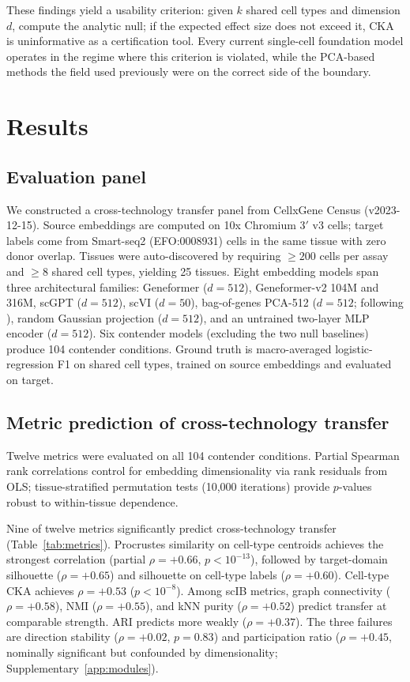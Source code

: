 \documentclass[11pt]{article}
\begin{document}
These findings yield a usability criterion: given $k$ shared cell types
and dimension $d$, compute the analytic null; if the expected effect
size does not exceed it, CKA is uninformative as a certification tool.
Every current single-cell foundation model operates in the regime where
this criterion is violated, while the PCA-based methods the field used
previously were on the correct side of the boundary.


\section{Results}

\subsection{Evaluation panel}
\label{sec:panel}

We constructed a cross-technology transfer panel from CellxGene Census
(v2023-12-15). Source embeddings are computed on 10x Chromium 3$'$ v3
cells; target labels come from Smart-seq2 (EFO:0008931) cells in the
same tissue with zero donor overlap. Tissues were auto-discovered by
requiring $\geq 200$ cells per assay and $\geq 8$ shared cell types,
yielding 25 tissues. Eight embedding models
span three architectural families: Geneformer \citep{theodoris2023geneformer}
($d = 512$), Geneformer-v2 104M and 316M, scGPT \citep{cui2024scgpt}
($d = 512$), scVI \citep{lopez2018scvi} ($d = 50$), bag-of-genes
PCA-512 ($d = 512$; following \citealp{cole2026morpheus}), random
Gaussian projection ($d = 512$), and an untrained two-layer MLP encoder
($d = 512$). Six contender models (excluding the two null baselines)
produce 104 contender conditions. Ground truth is macro-averaged
logistic-regression F1 on shared cell types, trained on source
embeddings and evaluated on target.


\subsection{Metric prediction of cross-technology transfer}
\label{sec:prediction}

Twelve metrics were evaluated on all 104 contender conditions. Partial
Spearman rank correlations control for embedding dimensionality via rank
residuals from OLS; tissue-stratified permutation tests (10,000
iterations) provide $p$-values robust to within-tissue dependence.

Nine of twelve metrics significantly predict cross-technology transfer
(Table~\ref{tab:metrics}). Procrustes similarity on cell-type centroids
achieves the strongest correlation (partial $\rho = +0.66$,
$p < 10^{-13}$), followed by target-domain silhouette ($\rho = +0.65$)
and silhouette on cell-type labels ($\rho = +0.60$). Cell-type CKA
achieves $\rho = +0.53$ ($p < 10^{-8}$). Among scIB metrics, graph
connectivity ($\rho = +0.58$), NMI ($\rho = +0.55$), and kNN purity
($\rho = +0.52$) predict transfer at comparable strength. ARI predicts
more weakly ($\rho = +0.37$). The three failures are
direction stability ($\rho = +0.02$, $p = 0.83$) and
participation ratio ($\rho = +0.45$, nominally significant but
confounded by dimensionality; Supplementary~\ref{app:modules}).
\end{document}
